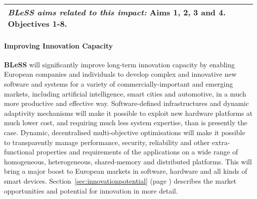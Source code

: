 \documentclass[a4paper,11pt]{article}
\newcommand{\project}[1]{\textbf{#1}\xspace}
\newcommand{\BLESS}{\project{BLeSS}}
\newcommand{\TheProject}{\BLESS}
\begin{document}
\begin{longtable}{|p{125pt}|p{320pt}|}
\vspace{10pt}
\noindent \emph{\TheProject aims related to this impact:}
\textbf{Aims 1, 2, 3 and 4. Objectives 1-8.}

\vspace{10pt}
\\
 \hline
\end{longtable}


\pagebreak
\paragraph*{Improving Innovation Capacity}
\noindent
\TheProject{} will significantly improve long-term innovation capacity by enabling 
European companies and individuals to develop complex and innovative new software and systems for a variety
of commercially-important and emerging markets, including artificial intelligence, smart cities and automotive,
in a much more productive and effective way.
Software-defined infrastructures and dynamic adaptivity mechanisms will make it possible to exploit new hardware platforms
at much lower cost, and requiring much less system expertise, than is presently the case.
Dynamic, decentralised multi-objective optimisations will make it possible to transparently manage performance, security, reliability and other extra-functional properties and requirements of the applications on a wide range of homogeneous, heterogeneous, shared-memory and distributed platforms. 
This will bring a major boost to European markets in software, hardware and all kinds of smart devices.
Section~\ref{sec:innovationpotential} (page \pageref{sec:innovationpotential}) describes the market opportunities and potential for innovation 
in more detail.

\end{document}
